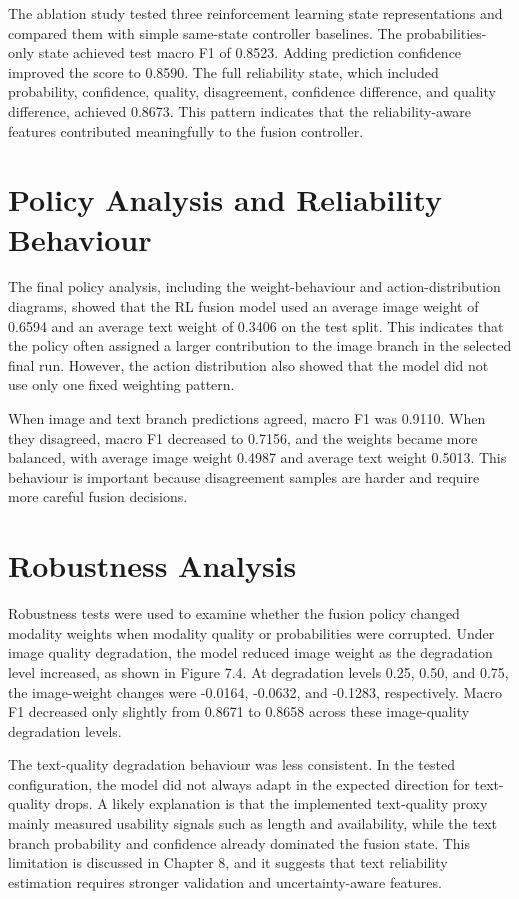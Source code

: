 The ablation study tested three reinforcement learning state representations and compared them with simple same-state controller baselines. The probabilities-only state achieved test macro F1 of 0.8523. Adding prediction confidence improved the score to 0.8590. The full reliability state, which included probability, confidence, quality, disagreement, confidence difference, and quality difference, achieved 0.8673. This pattern indicates that the reliability-aware features contributed meaningfully to the fusion controller.


\section{Policy Analysis and Reliability Behaviour}


The final policy analysis, including the weight-behaviour and action-distribution diagrams, showed that the RL fusion model used an average image weight of 0.6594 and an average text weight of 0.3406 on the test split. This indicates that the policy often assigned a larger contribution to the image branch in the selected final run. However, the action distribution also showed that the model did not use only one fixed weighting pattern.


When image and text branch predictions agreed, macro F1 was 0.9110. When they disagreed, macro F1 decreased to 0.7156, and the weights became more balanced, with average image weight 0.4987 and average text weight 0.5013. This behaviour is important because disagreement samples are harder and require more careful fusion decisions.


\section{Robustness Analysis}


Robustness tests were used to examine whether the fusion policy changed modality weights when modality quality or probabilities were corrupted. Under image quality degradation, the model reduced image weight as the degradation level increased, as shown in Figure 7.4. At degradation levels 0.25, 0.50, and 0.75, the image-weight changes were -0.0164, -0.0632, and -0.1283, respectively. Macro F1 decreased only slightly from 0.8671 to 0.8658 across these image-quality degradation levels.


The text-quality degradation behaviour was less consistent. In the tested configuration, the model did not always adapt in the expected direction for text-quality drops. A likely explanation is that the implemented text-quality proxy mainly measured usability signals such as length and availability, while the text branch probability and confidence already dominated the fusion state. This limitation is discussed in Chapter 8, and it suggests that text reliability estimation requires stronger validation and uncertainty-aware features.


